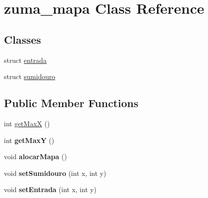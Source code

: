 \hypertarget{classzuma__mapa}{\section{zuma\-\_\-mapa Class Reference}
\label{classzuma__mapa}
}
\subsection*{Classes}
\begin{DoxyCompactItemize}
\item 
struct \hyperlink{structzuma__mapa_1_1entrada}{entrada}
\item 
struct \hyperlink{structzuma__mapa_1_1sumidouro}{sumidouro}
\end{DoxyCompactItemize}
\subsection*{Public Member Functions}
\begin{DoxyCompactItemize}
\item 
int \hyperlink{classzuma__mapa_a3e652bff59870aa6cdb7dae139168505}{get\-Max\-X} ()
\item 
\hypertarget{classzuma__mapa_ac9c0884ff67243a35acb31b9dbf2b1f9}{int {\bfseries get\-Max\-Y} ()}\label{classzuma__mapa_ac9c0884ff67243a35acb31b9dbf2b1f9}

\item 
\hypertarget{classzuma__mapa_a95ecdb9de85059801f92fb454191105f}{void {\bfseries alocar\-Mapa} ()}\label{classzuma__mapa_a95ecdb9de85059801f92fb454191105f}

\item 
\hypertarget{classzuma__mapa_adb7636aebdd674e47b63e35511b2e7d1}{void {\bfseries set\-Sumidouro} (int x, int y)}\label{classzuma__mapa_adb7636aebdd674e47b63e35511b2e7d1}

\item 
\hypertarget{classzuma__mapa_a789e3886d070ead42d48d88042ad7063}{void {\bfseries set\-Entrada} (int x, int y)}\label{classzuma__mapa_a789e3886d070ead42d48d88042ad7063}

\end{DoxyCompactItemize}
